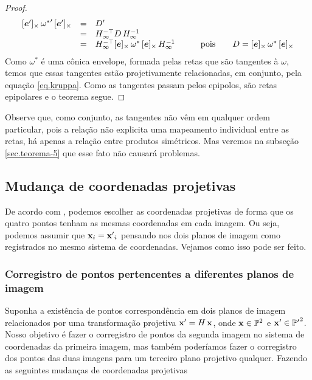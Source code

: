 \begin{proof}
\begin{equation}\label{eq.kruppa}
\begin{array}{rcll}
[\boldsymbol{e}']_\times\,{{\bf \omega}^*}'\,[\boldsymbol{e}']_\times&=&D'&\\
&=&H_\infty^{-\top}D\,H_\infty^{-1}&\\
&=&H_\infty^{-\top}[\boldsymbol{e}]_\times\,{\bf \omega}^*\,[\boldsymbol{e}]_\times\,H_\infty^{-1}&\qquad\text{pois}\qquad D=[\boldsymbol{e}]_\times\,{\bf \omega}^*\,[\boldsymbol{e}]_\times\\
\end{array}
\end{equation}
Como $\omega^*$ é uma cônica envelope, formada pelas retas que são tangentes à $\omega$, temos que essas tangentes estão projetivamente relacionadas, em conjunto, pela equação \ref{eq.kruppa}. Como as tangentes passam pelos epipolos, são retas epipolares e o teorema segue.

\end{proof}
Observe que, como conjunto, as tangentes não vêm em qualquer ordem particular, pois a relação não explicita uma mapeamento individual entre as retas, há apenas a relação entre produtos simétricos. Mas veremos na subseção \ref{sec.teorema-5} que esse fato não causará problemas.



\subsection{Mudança de coordenadas projetivas}

De acordo com \cite{kneebone}, podemos escolher as coordenadas projetivas de forma que os quatro pontos tenham as mesmas coordenadas em cada imagem. Ou seja, podemos assumir que ${\bf x}_i = {\bf x'}_i$ pensando nos dois planos de imagem como registrados no mesmo sistema de coordenadas. Vejamos como isso pode ser feito.

\subsubsection{Corregistro de pontos pertencentes a diferentes planos de imagem}\label{sec.corregistro-pontos}
Suponha a existência de pontos correspondência em dois planos de imagem relacionados por uma transformação projetiva $\mathbf{x}'=H\,\mathbf{x}$, onde $\mathbf{x}\in {\mathbb{P}^2}$ e $\mathbf{x}'\in {\mathbb{P'}^2}$. Nosso objetivo é fazer o corregistro de pontos da segunda imagem no sistema de coordenadas da primeira imagem, mas também poderíamos fazer o corregistro dos pontos das duas imagens para um terceiro plano projetivo qualquer. Fazendo as seguintes mudanças de coordenadas projetivas

